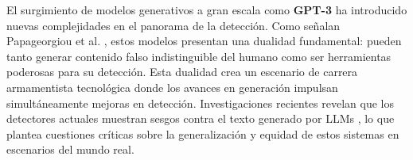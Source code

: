 El surgimiento de modelos generativos a gran escala como \textbf{GPT-3} \cite{brown2020language} ha introducido nuevas complejidades en el panorama de la detección. Como señalan Papageorgiou et al. \cite{papageorgiou2024survey}, estos modelos presentan una dualidad fundamental: pueden tanto generar contenido falso indistinguible del humano como ser herramientas poderosas para su detección. Esta dualidad crea un escenario de carrera armamentista tecnológica donde los avances en generación impulsan simultáneamente mejoras en detección. Investigaciones recientes revelan que los detectores actuales muestran sesgos contra el texto generado por LLMs \cite{su2023fake}, lo que plantea cuestiones críticas sobre la generalización y equidad de estos sistemas en escenarios del mundo real.

\begin{table}[htbp]
\centering
{}
\end{table}
